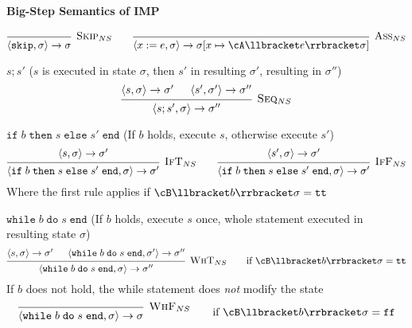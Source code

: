 \paragraph{Big-Step Semantics of IMP}
\[
    \begin{prooftree}
        \infer0[\textsc{Skip}$_{NS}$]{\langle \texttt{skip}, \sigma \rangle \rightarrow \sigma}
    \end{prooftree}
    \qquad
    \begin{prooftree}
        \infer0[\textsc{Ass}$_{NS}$]{\langle x := e, \sigma \rangle \rightarrow \sigma[x \mapsto \cA\llbracket e \rrbracket \sigma ]}
    \end{prooftree}
\]

 $s;s'$ ($s$ is executed in state $\sigma$, then $s'$ in resulting $\sigma'$, resulting in $\sigma''$)
\[
    \begin{prooftree}
        \hypo{\langle s, \sigma \rangle \rightarrow \sigma'}
        \hypo{\langle s', \sigma' \rangle \rightarrow \sigma''}
        \infer2[\textsc{Seq}$_{NS}$]{\langle s;s', \sigma \rangle \rightarrow \sigma''}
    \end{prooftree}
\]

 $\texttt{if}\; b \; \texttt{then} \; s \; \texttt{else} \; s' \; \texttt{end}$ (If $b$ holds, execute $s$, otherwise execute $s'$)
\[
    \begin{prooftree}
        \hypo{\langle s, \sigma \rangle \rightarrow \sigma'}
        \infer1[\textsc{IfT}$_{NS}$]{\langle \texttt{if}\; b \; \texttt{then} \; s \; \texttt{else} \; s' \; \texttt{end}, \sigma \rangle \rightarrow \sigma'}
    \end{prooftree}
    \qquad
    \begin{prooftree}
        \hypo{\langle s', \sigma \rangle \rightarrow \sigma'}
        \infer1[\textsc{IfF}$_{NS}$]{\langle \texttt{if}\; b \; \texttt{then} \; s \; \texttt{else} \; s' \; \texttt{end}, \sigma \rangle \rightarrow \sigma'}
    \end{prooftree}
\]
Where the first rule applies if $\cB\llbracket b \rrbracket \sigma = \texttt{tt}$

 $\texttt{while} \; b \; \texttt{do} \; s \; \texttt{end}$ (If $b$ holds, execute $s$ once, whole statement executed in resulting state $\sigma$)
\[
    \begin{prooftree}
        \hypo{\langle s, \sigma \rangle \rightarrow \sigma'}
        \hypo{\langle \texttt{while} \; b \; \texttt{do} \; s \; \texttt{end}, \sigma' \rangle \rightarrow \sigma''}
        \infer2[\textsc{WhT}$_{NS}$]{\langle \texttt{while} \; b \; \texttt{do} \; s \; \texttt{end}, \sigma \rangle \rightarrow \sigma''}
    \end{prooftree}
    \qquad
    \text{if }
    \cB\llbracket b \rrbracket \sigma = \texttt{tt}
\]
If $b$ does not hold, the while statement does \textit{not} modify the state
\[
    \begin{prooftree}
        \infer0[\textsc{WhF}$_{NS}$]{\langle \texttt{while} \; b \; \texttt{do} \; s \; \texttt{end}, \sigma \rangle \rightarrow \sigma}
    \end{prooftree}
    \qquad
    \text{if }
    \cB\llbracket b \rrbracket \sigma = \texttt{ff}
\]
